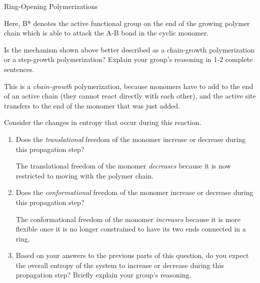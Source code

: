 \begin{activity}{Ring-Opening Polymerizations}
\begin{model}
	Here, B* denotes the active functional group on the end of the growing polymer chain which is able to attack the A-B bond in the cyclic monomer.
	
	
	
\end{model}


\begin{ctqs}

	\question Is the mechanism shown above better described as a chain-growth polymerization or a step-growth polymerization?  Explain your group's reasoning in 1-2 complete sentences.
			
				\begin{solution}[1in]{}
					This is a \emph{chain-growth} polymerization, because monomers have to add to the end of an active chain (they cannot react directly with each other), and the active site transfers to the end of the monomer that was just added.
				\end{solution}
	
	\question Consider the changes in entropy that occur during this reaction.
	
		\begin{enumerate}
			
			\item Does the \textit{translational} freedom of the monomer increase or decrease during this propagation step?  %
			
				\begin{solution}[0.3in]{}
					The translational freedom of the monomer \textit{decreases} because it is now restricted to moving with the polymer chain.
				\end{solution}
			
			\item Does the \textit{conformational} freedom of the monomer increase or decrease during this propagation step?  %
			
				\begin{solution}[0.3in]{}
					The conformational freedom of the monomer \textit{increases} because it is more flexible once it is no longer constrained to have its two ends connected in a ring.
				\end{solution}
			
			\item Based on your answers to the previous parts of this question, do you expect the overall entropy of the system to increase or decrease during this propagation step?  Briefly explain your group's reasoning.
			

\end{enumerate}
\end{ctqs}
\end{activity}
